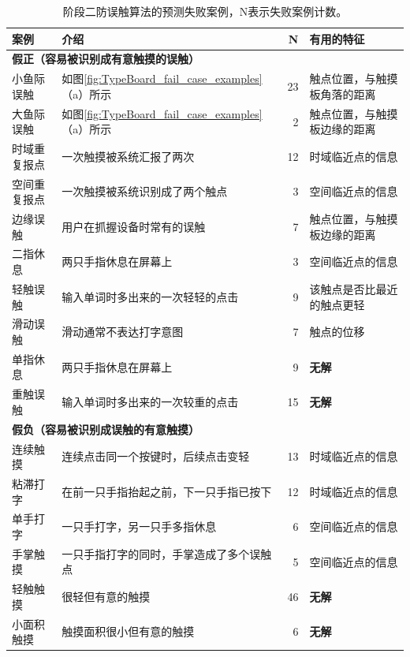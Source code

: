 \begin{table}[htbp]
	\centering
	\begin{tabular}{|p{6.4em}|p{16em}|r|p{10em}|}
		\toprule
		\textbf{案例} & \textbf{介绍} & {\textbf{N}} & \textbf{有用的特征} \\
		\midrule
		\multicolumn{4}{|l|}{\textbf{假正（容易被识别成有意触摸的误触）}} \\
		\midrule
		小鱼际误触 & 如图\ref{fig:TypeBoard_fail_case_examples}（a）所示 & 23    & 触点位置，与触摸板角落的距离 \\
		\midrule
		大鱼际误触 & 如图\ref{fig:TypeBoard_fail_case_examples}（a）所示 & 2     & 触点位置，与触摸板边缘的距离 \\
		\midrule
		时域重复报点 & 一次触摸被系统汇报了两次 & 12    & 时域临近点的信息 \\
		\midrule
		空间重复报点 & 一次触摸被系统识别成了两个触点 & 3     & 空间临近点的信息 \\
		\midrule
		边缘误触 & 用户在抓握设备时常有的误触 & 7     & 触点位置，与触摸板边缘的距离 \\
		\midrule
		二指休息 & 两只手指休息在屏幕上 & 3     & 空间临近点的信息 \\
		\midrule
		轻触误触 & 输入单词时多出来的一次轻轻的点击 & 9     & 该触点是否比最近的触点更轻 \\
		\midrule
		滑动误触 & 滑动通常不表达打字意图 & 7     & 触点的位移 \\
		\midrule
		\rowcolor[rgb]{ .949,  .949,  .949} 单指休息 & 两只手指休息在屏幕上 & 9     & \textbf{无解} \\
		\midrule
		\rowcolor[rgb]{ .949,  .949,  .949} 重触误触 & 输入单词时多出来的一次较重的点击 & 15    & \textbf{无解} \\
		\midrule
		\multicolumn{4}{|l|}{\textbf{假负（容易被识别成误触的有意触摸）}} \\
		\midrule
		连续触摸 & 连续点击同一个按键时，后续点击变轻 & 13    & 时域临近点的信息 \\
		\midrule
		粘滞打字\cite{2018-Observations} & 在前一只手指抬起之前，下一只手指已按下 & 12    & 时域临近点的信息 \\
		\midrule
		单手打字 & 一只手打字，另一只手多指休息 & 6     & 空间临近点的信息 \\
		\midrule
		手掌触摸 & 一只手指打字的同时，手掌造成了多个误触点 & 5     & 空间临近点的信息 \\
		\midrule
		\rowcolor[rgb]{ .949,  .949,  .949} 轻触触摸 & 很轻但有意的触摸 & 46    & \textbf{无解} \\
		\midrule
		\rowcolor[rgb]{ .949,  .949,  .949} 小面积触摸 & 触摸面积很小但有意的触摸 & 6     & \textbf{无解} \\
		\bottomrule
	\end{tabular}%
	\caption{阶段二防误触算法的预测失败案例，N表示失败案例计数。}
	\label{tab:TypeBoard_fail_cases}%
\end{table}%

